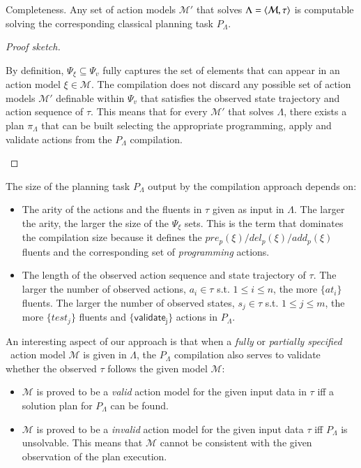\begin{mylemma}
Completeness. Any set of action models $\mathcal{M}'$ that solves $\Lambda={\langle \mathcal{M},\tau \rangle}$ is computable solving the corresponding classical planning task $P_{\Lambda}$.
\end{mylemma}

\begin{proof}[Proof sketch]
\begin{small}
  By definition, $\Psi_{\xi}\subseteq \Psi_v$ fully captures the set of elements that can appear in an action model $\xi\in\mathcal{M}$. The compilation does not discard any possible set of action models $\mathcal{M}'$ definable within $\Psi_v$ that satisfies the observed state trajectory and action sequence of $\tau$. This means that for every $\mathcal{M}'$ that solves $\Lambda$, there exists a plan $\pi_\Lambda$ that can be built selecting the appropriate programming, apply and validate actions from the $P_{\Lambda}$ compilation.
\end{small}
\end{proof}

The size of the planning task $P_{\Lambda}$ output by the compilation approach depends on:

\begin{itemize}
\item The arity of the actions and the fluents in $\tau$ given as input in $\Lambda$. The larger the arity, the larger the size of the $\Psi_{\xi}$ sets. This is the term that dominates the compilation size because it defines the $pre_p(\xi)/del_p(\xi)/add_p(\xi)$ fluents and the corresponding set of {\em programming} actions.
\item The length of the observed action sequence and state trajectory of $\tau$. The larger the number of observed actions, $a_i\in\tau$ s.t. $1\leq i\leq n$, the more $\{at_i\}$ fluents. The larger the number of observed states, $s_j\in\tau$ s.t. $1\leq j\leq m$, the more $\{test_j\}$ fluents and $\{\mathsf{validate_{j}}\}$ actions in $P_{\Lambda}$.
\end{itemize}

An interesting aspect of our approach is that when a {\em fully} or {\em partially specified} \strips\ action model $\mathcal{M}$ is given in $\Lambda$, the $P_{\Lambda}$ compilation also serves to validate whether the observed $\tau$ follows the given model $\mathcal{M}$:

\begin{itemize}
	\item $\mathcal{M}$ is proved to be a {\em valid} action model for the given input data in $\tau$ iff a solution plan for $P_{\Lambda}$ can be found.
	\item $\mathcal{M}$ is proved to be a {\em invalid} action model for the given input data $\tau$ iff $P_{\Lambda}$ is unsolvable. This means that $\mathcal{M}$ cannot be consistent with the given observation of the plan execution.
\end{itemize}


